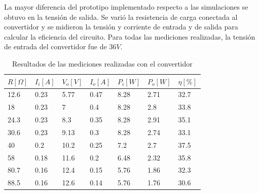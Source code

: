 La mayor diferencia del prototipo implementado respecto a las simulaciones se obtuvo en la tensión de salida. 
Se varió la resistencia de carga conectada al convertidor y se midieron la tensión y corriente de entrada y de salida para calcular la eficiencia del circuito.
Para todas las mediciones realizadas, la tensión de entrada del convertidor fue de $36V$.

\begin{table}[H]
    \centering
    \begin{tabular}{lllllll}
        \hline
        \multicolumn{1}{c}{$R[\Omega]$} & \multicolumn{1}{c}{$I_i[A]$} & \multicolumn{1}{c}{$V_o[V]$} & \multicolumn{1}{c}{$I_o[A]$} & \multicolumn{1}{c}{$P_i[W]$} & \multicolumn{1}{c}{$P_o[W]$} & \multicolumn{1}{c}{$\eta[\%]$} \\ \hline
        12.6                            & 0.23                         & 5.77                         & 0.47                         & 8.28                         & 2.71                         & 32.7                           \\
        18                              & 0.23                         & 7                            & 0.4                          & 8.28                         & 2.8                          & 33.8                           \\
        24.3                            & 0.23                         & 8.3                          & 0.35                         & 8.28                         & 2.91                         & 35.1                           \\
        30.6                            & 0.23                         & 9.13                         & 0.3                          & 8.28                         & 2.74                         & 33.1                           \\
        40                              & 0.2                          & 10.2                         & 0.25                         & 7.2                          & 2.7                          & 37.5                           \\
        58                              & 0.18                         & 11.6                         & 0.2                          & 6.48                         & 2.32                         & 35.8                           \\
        80.7                            & 0.16                         & 12.4                         & 0.15                         & 5.76                         & 1.86                         & 32.3                           \\
        88.5                            & 0.16                         & 12.6                         & 0.14                         & 5.76                         & 1.76                         & 30.6                           \\ \hline
    \end{tabular}
    \caption{Resultados de las mediciones realizadas con el convertidor}
    \label{tab:mediciones}
\end{table}


